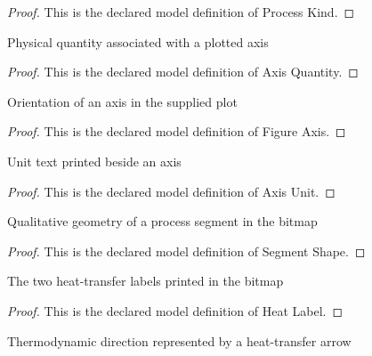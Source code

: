 \begin{proof}
  This is the declared model definition of Process Kind.
\end{proof}
\begin{definition}
  \label{def:physics:phyx-mini-0481:phyxminiproblems-problemphyxmini0481-axisquantity}
  Physical quantity associated with a plotted axis
\end{definition}
\begin{proof}
  This is the declared model definition of Axis Quantity.
\end{proof}
\begin{definition}
  \label{def:physics:phyx-mini-0481:phyxminiproblems-problemphyxmini0481-figureaxis}
  Orientation of an axis in the supplied plot
\end{definition}
\begin{proof}
  This is the declared model definition of Figure Axis.
\end{proof}
\begin{definition}
  \label{def:physics:phyx-mini-0481:phyxminiproblems-problemphyxmini0481-axisunit}
  Unit text printed beside an axis
\end{definition}
\begin{proof}
  This is the declared model definition of Axis Unit.
\end{proof}
\begin{definition}
  \label{def:physics:phyx-mini-0481:phyxminiproblems-problemphyxmini0481-segmentshape}
  Qualitative geometry of a process segment in the bitmap
\end{definition}
\begin{proof}
  This is the declared model definition of Segment Shape.
\end{proof}
\begin{definition}
  \label{def:physics:phyx-mini-0481:phyxminiproblems-problemphyxmini0481-heatlabel}
  The two heat-transfer labels printed in the bitmap
\end{definition}
\begin{proof}
  This is the declared model definition of Heat Label.
\end{proof}
\begin{definition}
  \label{def:physics:phyx-mini-0481:phyxminiproblems-problemphyxmini0481-heattransferdirection}
  Thermodynamic direction represented by a heat-transfer arrow
\end{definition}
